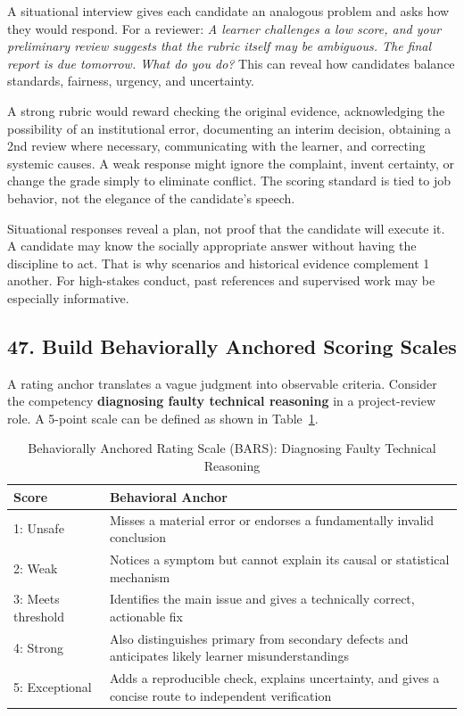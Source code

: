 A situational interview gives each candidate an analogous problem and asks how they would respond. For a reviewer: \textit{A learner challenges a low score, and your preliminary review suggests that the rubric itself may be ambiguous. The final report is due tomorrow. What do you do?} This can reveal how candidates balance standards, fairness, urgency, and uncertainty.

A strong rubric would reward checking the original evidence, acknowledging the possibility of an institutional error, documenting an interim decision, obtaining a 2nd review where necessary, communicating with the learner, and correcting systemic causes. A weak response might ignore the complaint, invent certainty, or change the grade simply to eliminate conflict. The scoring standard is tied to job behavior, not the elegance of the candidate's speech.

Situational responses reveal a plan, not proof that the candidate will execute it. A candidate may know the socially appropriate answer without having the discipline to act. That is why scenarios and historical evidence complement 1 another. For high-stakes conduct, past references and supervised work may be especially informative.

\subsection*{47. Build Behaviorally Anchored Scoring Scales}

A rating anchor translates a vague judgment into observable criteria. Consider the competency \textbf{diagnosing faulty technical reasoning} in a project-review role. A 5-point scale can be defined as shown in Table~\ref{tab:bars_scale}.

\begin{table}[htbp]
\centering
\small
\caption{Behaviorally Anchored Rating Scale (BARS): Diagnosing Faulty Technical Reasoning}
\label{tab:bars_scale}
\begin{tabularx}{\columnwidth}{l X}
\toprule
\textbf{Score} & \textbf{Behavioral Anchor} \\
\midrule
1: Unsafe & Misses a material error or endorses a fundamentally invalid conclusion \\
2: Weak & Notices a symptom but cannot explain its causal or statistical mechanism \\
3: Meets threshold & Identifies the main issue and gives a technically correct, actionable fix \\
4: Strong & Also distinguishes primary from secondary defects and anticipates likely learner misunderstandings \\
5: Exceptional & Adds a reproducible check, explains uncertainty, and gives a concise route to independent verification \\
\bottomrule
\end{tabularx}
\end{table}

